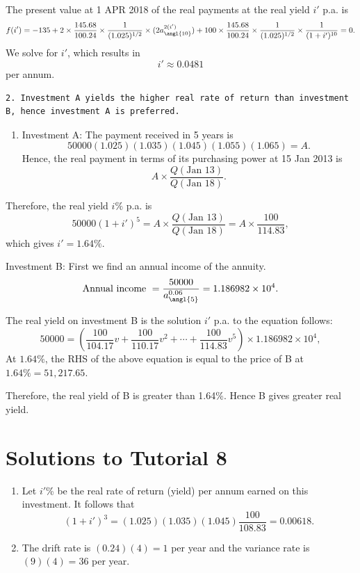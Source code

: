 \documentclass[
]{book}
\providecommand{\tightlist}{%
  \setlength{\itemsep}{0pt}\setlength{\parskip}{0pt}}
\theoremstyle{definition}
\theoremstyle{definition}
\theoremstyle{definition}
\theoremstyle{definition}
\theoremstyle{remark}
\begin{document}
The present value at 1 APR 2018 of the real payments at the real yield \(i'\) p.a. is
\[ f(i') = -135 + 2 \times \frac{145.68  }{100.24} \times \frac{1}{ (1.025)^{1/2}} \times(2 a^{2(i')}_{\angl{10}}) + 100 \times \frac{145.68  }{100.24} \times \frac{1}{ (1.025)^{1/2}} \times \frac{1}{(1+i')^{10}} = 0.\]
We solve for \(i'\), which results in
\[i' \approx 0.0481\] per annum.

\begin{verbatim}
2. Investment A yields the higher real rate of return than investment B, hence investment A is preferred. 
\end{verbatim}

\begin{enumerate}
\def\labelenumi{\arabic{enumi}.}
\setcounter{enumi}{4}
\tightlist
\item
  Investment A: The payment received in 5 years is
  \[50000(1.025)(1.035)(1.045)(1.055)(1.065) = A.\]
  Hence, the real payment in terms of its purchasing power at 15 Jan 2013 is
  \[ A \times \frac{Q(\text{Jan 13})}{Q(\text{Jan 18})}.\]
\end{enumerate}

Therefore, the real yield \(i\%\) p.a. is
\[50000 (1 + i')^5 = A \times \frac{Q(\text{Jan 13})}{Q(\text{Jan 18})} = A \times \frac{100}{114.83},\]
which gives \(i' = 1.64\%.\)

Investment B: First we find an annual income of the annuity.
\[\text{Annual income } = \frac{50000}{a^{0.06}_{\angl{5}}} = \ensuremath{1.186982\times 10^{4}}.\]

The real yield on investment B is the solution
\(i'\) p.a. to the equation
follows:
\[50000 = \left( \frac{100}{104.17} v  + \frac{100}{110.17} v^2 +  \cdots + \frac{100}{114.83}v^5  \right)\times \ensuremath{1.186982\times 10^{4}},\]
At \(1.64\%\), the RHS of the above equation is equal to the price of B at \(1.64\% = 51,217.65 .\)

Therefore, the real yield of B is greater than 1.64\%. Hence B gives greater real yield.

\section{Solutions to Tutorial 8}\label{solutions-to-tutorial-8}

\begin{enumerate}
\def\labelenumi{\arabic{enumi}.}
\item
  Let \(i'\)\% be the real rate of return (yield) per annum earned on this investment. It follows that
  \[(1 + i')^3 = (1.025)(1.035)(1.045)\frac{100}{108.83} = 0.00618.\]
\item
  The drift rate is \((0.24)(4) = 1\) per year and the variance rate is \((9)(4) = 36\) per year.
\end{enumerate}
\end{document}
